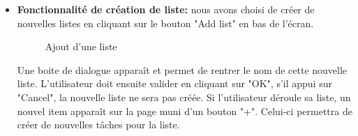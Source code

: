 \documentclass[a4paper,10pt]{article}
\begin{document}
\begin{itemize}
\item \textbf{Fonctionnalité de création de liste:} nous avons choisi de créer de nouvelles listes en cliquant sur le bouton "Add list" en bas de l'écran.
\begin{figure}[H]
    \center
    \quad
    \quad
    \caption{Ajout d'une liste}
\end{figure}
Une boite de dialogue apparaît et permet de rentrer le nom de cette nouvelle liste. L'utilisateur doit ensuite valider en cliquant sur "OK", s'il appui sur "Cancel", la nouvelle liste ne sera pas créée. Si l'utilisateur déroule sa liste, un nouvel item apparaît sur la page muni d'un bouton "+". Celui-ci permettra de créer de nouvelles tâches pour la liste.

\end{itemize}
\end{document}
